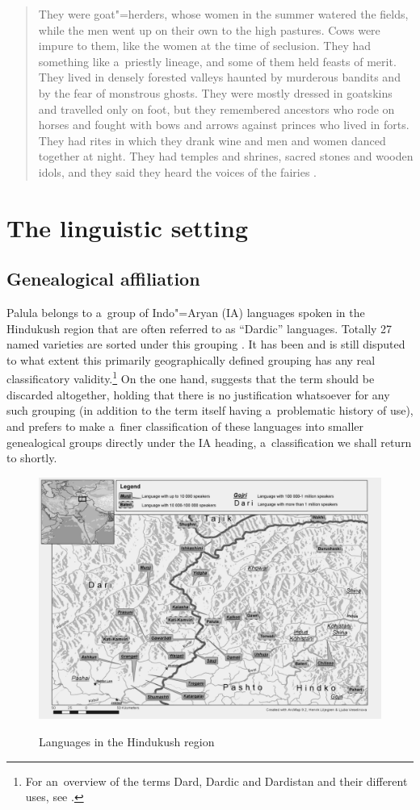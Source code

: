 \begin{quote}
They were goat"=herders, whose women in the summer watered the fields, while the men went up on their
own to the high pastures. Cows were impure to them, like the women at the time of seclusion. They
had something like a~priestly lineage, and some of them held feasts of merit. They lived in densely
forested valleys haunted by murderous bandits and by the fear of monstrous ghosts. They were mostly
dressed in goatskins and travelled only on foot, but they remembered ancestors who rode on horses
and fought with bows and arrows against princes who lived in forts. They had rites in which they
drank wine and men and women danced together at night. They had temples and shrines, sacred stones
and wooden idols, and they said they heard the voices of the fairies \citep[143]{cacopardo2001}.
\end{quote}

\section{The linguistic setting}
\label{sec:1-3}
\subsection{Genealogical affiliation}
\label{subsec:1-3-1}
Palula belongs to a~group of Indo"=Aryan (IA) languages spoken in the Hindukush region that are often referred to as ``Dardic'' languages. Totally 27 named varieties are sorted under this grouping \citep{ethnologue2015}. It has been and is still disputed to what extent this primarily geographically defined grouping has any real classificatory validity.\footnote{For an~overview of the terms Dard, Dardic and Dardistan and their different uses, see \citealt{mock1997}.} On the one hand, \citet[251]{strand2001} suggests that the term should be discarded altogether, holding that there is no justification whatsoever for any such grouping (in addition to the term itself having a~problematic history of use), and prefers to make a~finer classification of these languages into smaller genealogical groups directly under the IA heading, a~classification we shall return to shortly. 

\begin{figure}
\caption{Languages in the Hindukush region}
\includegraphics[width=.8\textwidth]{figures/ch1map2.pdf}
\label{map:1-2}
\end{figure}

